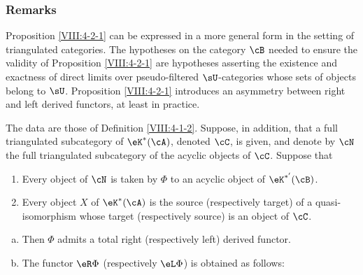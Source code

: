 \subsubsection{Remarks}\label{VIII:4-2-2}

Proposition \ref{VIII:4-2-1} can be expressed in a more general form in
the setting of triangulated categories. The hypotheses on the category
$\cB$ needed to ensure the validity of Proposition \ref{VIII:4-2-1} are
hypotheses asserting the existence and exactness of direct limits over
pseudo-filtered $\sU$-categories whose sets of objects belong to $\sU$.
Proposition \ref{VIII:4-2-1} introduces an asymmetry between right and
left derived functors, at least in practice.

\begin{theorem}\label{VIII:4-2-3} %
The data are those of Definition \ref{VIII:4-1-2}. Suppose, in addition,
that a full triangulated subcategory of $\eK^\ast(\cA)$, denoted $\cC$, is given,
and denote by $\cN$ the full triangulated subcategory of the acyclic
objects of $\cC$. Suppose that
\begin{enumerate}[(1)]
  \item Every object of $\cN$ is taken by $\Phi$ to an acyclic object of
    $\eK^{\ast'}(\cB)$.
  \item Every object $X$ of $\eK^\ast(\cA)$ is the source (respectively
    target) of a quasi-isomorphism whose target (respectively source) is
    an object of $\cC$.
\end{enumerate}
\begin{enumerate}[a)]
  \item Then $\Phi$ admits a total right (respectively left) derived
    functor.
  \item The functor $\eR \Phi$ (respectively $\eL \Phi$) is obtained as
    follows:


\end{enumerate}
\end{theorem}
